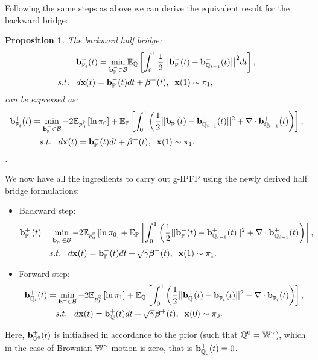 \documentclass[a4paper,12pt,twoside,openright]{report}
\newtheorem{proposition}{Proposition}
\theoremstyle{definition}
\begin{document}
Following the same steps as above we can derive the equivalent result for the backward bridge:
\begin{proposition}
The backward half bridge:
\begin{align*} 
   {\mathbf{b}}^{-}_{{\mathbb{P}}_{i}}(t) =\min_{{\mathbf{b}}_{{\mathbb{P}}}^{-} \in {\mathcal{B}} } & \mathbb{E}_{\mathbb{Q}}\left[\int_0^1 \frac{1}{2}\big|\big|{\mathbf{b}}_{\mathbb{P}}^{-}(t) -{\mathbf{b}}^{-}_{{\mathbb{Q}}_{i-1}}(t)\big|\big|^2 dt\right], \nonumber \\
    s.t.\;\;\; d{\mathbf{x}}(t) = {\mathbf{b}}_{\mathbb{P}}^{-}(t) &dt +  {\bm{\beta}}^{-}(t), \;\; {\mathbf{x}}(1) \sim \pi_1,
\end{align*}
can be expressed as:
\begin{align} \label{eq:div_control_backward}
   {\mathbf{b}}^{+}_{{\mathbb{P}}_{i}}(t) =\min_{{\mathbf{b}}_{\mathbb{P}}^{-} \in {\mathcal{B}} } -2\mathbb{E}_{p^{{\mathbb{P}}}_0}\left[\operatorname{ln} \pi_0 \right] &+ \mathbb{E}_{{\mathbb{P}}}\left[\int_0^1 \left(\frac{1}{2}||{\mathbf{b}}_{\mathbb{P}}^{-}(t) - {\mathbf{b}}_{{\mathbb{Q}}_{i-1}}^{+}(t)||^2 + \nabla\cdot{\mathbf{b}}^{+}_{{\mathbb{Q}}_{i-1}}(t) \right)\right], \nonumber \\
    s.t.\;\;\; d{\mathbf{x}}(t) = {\mathbf{b}}_{\mathbb{P}}^{-}(t) &dt +  {\bm{\beta}}^{-}(t), \;\; {\mathbf{x}}(1) \sim \pi_1.
\end{align}.
\end{proposition}
We now have all the ingredients to carry out g-IPFP using the newly derived half bridge formulations:
\begin{itemize}
    \item Backward step:
    \begin{align*}
   {\mathbf{b}}^{+}_{{\mathbb{P}}_{i}}(t) =\min_{{\mathbf{b}}_{\mathbb{P}}^{-} \in {\mathcal{B}} } -2\mathbb{E}_{p^{{\mathbb{P}}}_0}\left[\operatorname{ln} \pi_0 \right] &+ \mathbb{E}_{{\mathbb{P}}}\left[\int_0^1 \left(\frac{1}{2}||{\mathbf{b}}_{\mathbb{P}}^{-}(t) - {\mathbf{b}}_{{\mathbb{Q}}_{i-1}}^{+}(t)||^2 + \nabla\cdot{\mathbf{b}}^{+}_{{\mathbb{Q}}_{i-1}}(t) \right)\right], \nonumber \\
    s.t.\;\;\; d{\mathbf{x}}(t) = {\mathbf{b}}_{\mathbb{P}}^{-}(t) &dt + \sqrt{\gamma} {\bm{\beta}}^{-}(t), \;\; {\mathbf{x}}(1) \sim \pi_1.
    \end{align*}
    \item Forward step:
    \begin{align*} 
   {\mathbf{b}}^{+}_{{\mathbb{Q}}_{i}}(t) =\min_{{\mathbf{b}}^{+} \in {\mathcal{B}} } -2\mathbb{E}_{p^{{\mathbb{Q}}}_1}\left[\operatorname{ln} \pi_1 \right] &+ \mathbb{E}_{{\mathbb{Q}}}\left[\int_0^1 \left(\frac{1}{2}||{\mathbf{b}}_{\mathbb{Q}}^{+}(t) - {\mathbf{b}}_{{\mathbb{P}}_{i}}^{-}(t)||^2 - \nabla\cdot{\mathbf{b}}^{-}_{{\mathbb{P}}_{i}}(t) \right)\right], \nonumber \\
    s.t.\;\;\; d{\mathbf{x}}(t) = {\mathbf{b}}_{\mathbb{Q}}^{+}(t) &dt + \sqrt{\gamma} {\bm{\beta}}^{+}(t), \;\; {\mathbf{x}}(0) \sim \pi_0.
    \end{align*}
\end{itemize}
Here, ${\mathbf{b}}^{+}_{{\mathbb{Q}}^{0}}(t)$  is initialised in accordance to the prior (such that ${\mathbb{Q}}^0=\mathbb{W}^\gamma$), which in the case of Brownian $\mathbb{W}^\gamma$ motion is zero, that is ${\mathbf{b}}^{+}_{{\mathbb{Q}}_{0}}(t) =0$.
\end{document}
